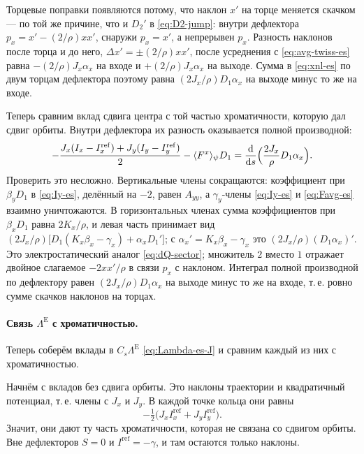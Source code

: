 Торцевые поправки появляются потому, что наклон $x'$ на торце меняется скачком --- по той же причине, что и $D_2'$ в \eqref{eq:D2-jump}: внутри дефлектора $p_x=x'-(2/\rho)xx'$, снаружи $p_x=x'$, а непрерывен $p_x$. Разность наклонов после торца и до него, $\Delta x'=\pm(2/\rho)xx'$, после усреднения с \eqref{eq:avg-twiss-es} равна $-(2/\rho)J_x\alpha_x$ на входе и $+(2/\rho)J_x\alpha_x$ на выходе. Сумма в \eqref{eq:xnl-es} по двум торцам дефлектора поэтому равна $(2J_x/\rho)D_1\alpha_x$ на выходе минус то же на входе.

Теперь сравним вклад сдвига центра с той частью хроматичности, которую дал сдвиг орбиты. Внутри дефлектора их разность оказывается полной производной:
\begin{equation}
\label{eq:dQ-es}
-\frac{J_x(I_x-I_x^{\mathrm{ref}})+J_y(I_y-I_y^{\mathrm{ref}})}{2}
-\langle F^x\rangle_\psi D_1
=\frac{\mathrm{d}}{\mathrm{d}s}\Bigl(\frac{2J_x}{\rho}D_1\alpha_x\Bigr).
\end{equation}
Проверить это несложно. Вертикальные члены сокращаются: коэффициент при $\beta_yD_1$ в \eqref{eq:Iy-es}, делённый на $-2$, равен $A_{yy}$, а $\gamma_y$-члены \eqref{eq:Iy-es} и \eqref{eq:Favg-es} взаимно уничтожаются. В горизонтальных членах сумма коэффициентов при $\beta_xD_1$ равна $2K_x/\rho$, и левая часть принимает вид $(2J_x/\rho)\bigl[D_1(K_x\beta_x-\gamma_x)+\alpha_xD_1'\bigr]$; с $\alpha_x'=K_x\beta_x-\gamma_x$ это $(2J_x/\rho)(D_1\alpha_x)'$. Это электростатический аналог \eqref{eq:dQ-sector}; множитель $2$ вместо $1$ отражает двойное слагаемое $-2xx'/\rho$ в связи $p_x$ с наклоном. Интеграл полной производной по дефлектору равен $(2J_x/\rho)D_1\alpha_x$ на выходе минус то же на входе, т.\,е. ровно сумме скачков наклонов на торцах.

\paragraph{Связь $\Lambda^{\mathrm{E}}$ с хроматичностью.}
Теперь соберём вклады в $C_s\Lambda^{\mathrm{E}}$ \eqref{eq:Lambda-es-J} и сравним каждый из них с хроматичностью.

Начнём с вкладов без сдвига орбиты. Это наклоны траектории и квадратичный потенциал, т.\,е. члены с $J_x$ и $J_y$. В каждой точке кольца они равны
\begin{equation*}
-\tfrac12\bigl(J_xI_x^{\mathrm{ref}}+J_yI_y^{\mathrm{ref}}\bigr).
\end{equation*}
Значит, они дают ту часть хроматичности, которая не связана со сдвигом орбиты. Вне дефлекторов $S=0$ и $I^{\mathrm{ref}}=-\gamma$, и там остаются только наклоны.

